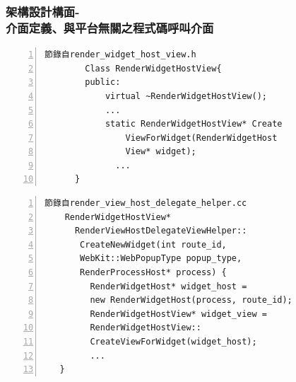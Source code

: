 \documentclass[utf8x]{beamer}
\begin{document}
\begin{frame}[fragile,t]%
\frametitle{架構設計構面-\\介面定義、與平台無關之程式碼呼叫介面}
\begin{table}[h]
\begin{center}
\begin{minipage}{72mm}
\linespread{0.8}
\fontsize{8pt}{6pt}\selectfont
\begin{Verbatim}[numbers=left,framesep=1mm,numbersep=1pt] 
	節錄自render_widget_host_view.h
	    Class RenderWidgetHostView{
	    public:
	        virtual ~RenderWidgetHostView();
	        ...
	        static RenderWidgetHostView* Create
	            ViewForWidget(RenderWidgetHost
	            View* widget);
	          ...
	  }
\end{Verbatim}
\end{minipage}
\end{center}
\end{table}
\begin{table}[h]
\begin{center}
\begin{minipage}{72mm}
\linespread{0.8}
\fontsize{8pt}{6pt}\selectfont
\begin{Verbatim}[numbers=left,framesep=1mm,numbersep=1pt]
節錄自render_view_host_delegate_helper.cc
    RenderWidgetHostView*
      RenderViewHostDelegateViewHelper::
       CreateNewWidget(int route_id, 
       WebKit::WebPopupType popup_type, 
       RenderProcessHost* process) {
         RenderWidgetHost* widget_host =
         new RenderWidgetHost(process, route_id);
         RenderWidgetHostView* widget_view =
         RenderWidgetHostView::
         CreateViewForWidget(widget_host);
         ...
   }
\end{Verbatim}
\end{minipage}
\end{center}
\end{table}
\end{frame}
\end{document}
